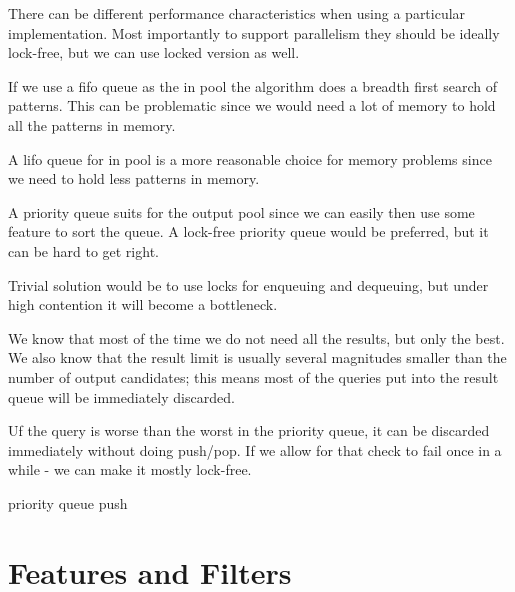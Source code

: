 There can be different performance characteristics when using a particular implementation. Most importantly to support parallelism they should be ideally lock-free, but we can use locked version as well.


If we use a fifo queue as the in pool the algorithm does a breadth first search of patterns. This can be problematic since we would need a lot of memory to hold all the patterns in memory.

A lifo queue for in pool is a more reasonable choice for memory problems since we need to hold less patterns in memory.

A priority queue suits for the output pool since we can easily then use some feature to sort the queue. A lock-free priority queue would be preferred, but it can be hard to get right. 

Trivial solution would be to use locks for enqueuing and dequeuing, but under high contention it will become a bottleneck.

We know that most of the time we do not need all the results, but only the best. We also know that the result limit is usually several magnitudes smaller than the number of output candidates; this means most of the queries put into the result queue will be immediately discarded.

Uf the query is worse than the worst in the priority queue, it can be discarded immediately without doing push/pop. If we allow for that check to fail once in a while - we can make it mostly lock-free.

\begin{algorithm}[H]
    \caption{priority queue push}
\begin{algorithmic}[1]   
        
        \Return
    \EndIf

    \EndIf
\end{algorithmic}
\end{algorithm}

\section{Features and Filters}

